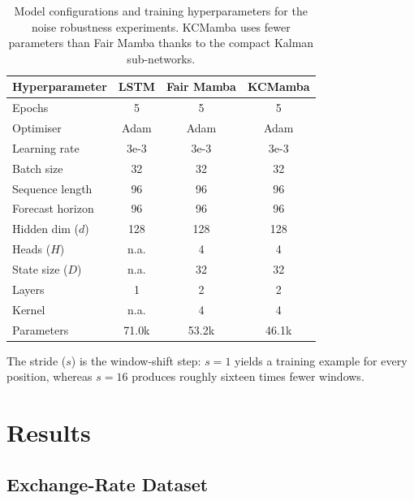 \begin{table}[H]
    \centering
    \begin{tabular}{|l|c|c|c|}
        \hline
        \textbf{Hyperparameter} & \textbf{LSTM} & \textbf{Fair Mamba} & KCMamba \\
        \hline\hline
        Epochs              & 5      & 5      & 5 \\
        Optimiser           & Adam   & Adam   & Adam \\
        Learning rate       & 3e-3   & 3e-3   & 3e-3 \\
        Batch size          & 32     & 32     & 32 \\
        Sequence length     & 96     & 96     & 96 \\
        Forecast horizon    & 96     & 96     & 96 \\
        Hidden dim ($d$)    & 128    & 128    & 128 \\
        Heads ($H$)         & n.a.   & 4      & 4 \\
        State size ($D$)    & n.a.   & 32     & 32 \\
        Layers              & 1      & 2      & 2 \\
        Kernel              & n.a.   & 4      & 4 \\
        \hline
        Parameters          & 71{.}0k & 53{.}2k & 46{.}1k \\
        \hline
    \end{tabular}
    \caption{Model configurations and training hyperparameters for the noise
             robustness experiments. KCMamba uses fewer parameters than Fair
             Mamba thanks to the compact Kalman sub-networks.}
    \label{tab:hyperparams}
\end{table}

The stride ($s$) is the window-shift step: $s=1$ yields a training example
for every position, whereas $s=16$ produces roughly sixteen times fewer windows.

\section{Results}
\label{sec:results}

\subsection{Exchange-Rate Dataset}

